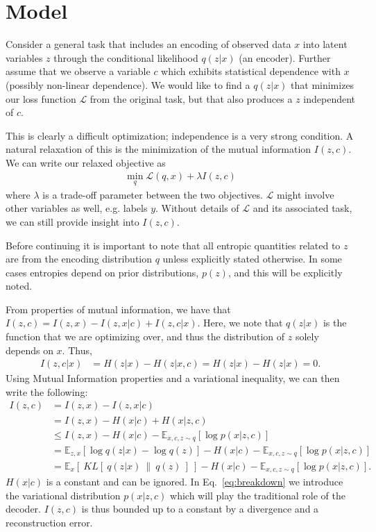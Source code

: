 
\section{Model}
\label{sec:model}

Consider a general task that includes an encoding of observed data $x$ into latent variables $z$ through the conditional likelihood $q(z|x)$ (an encoder). Further assume that we observe a variable $c$ which exhibits statistical dependence with $x$ (possibly non-linear dependence). We would like to find a $q(z|x)$ that minimizes our loss function $\mathcal{L}$ from the original task, but that also produces a $z$ independent of $c$.

This is clearly a difficult optimization; independence is a very strong condition. A natural relaxation of this is the minimization of the mutual information $I(z,c)$. We can write our relaxed objective as
\begin{align}
\min_q \mathcal{L}(q,x) + \lambda I(z,c) \label{eq:gen_loss}
\end{align}
where $\lambda$ is a trade-off parameter between the two objectives. $\mathcal{L}$ might involve other variables as well, e.g. labels $y$. Without details of $\mathcal{L}$ and its associated task, we can still provide insight into $I(z,c)$. 

Before continuing it is important to note that all entropic quantities related to $z$ are from the encoding distribution $q$ unless explicitly stated otherwise. In some cases entropies depend on prior distributions, $p(z)$, and this will be explicitly noted.

From properties of mutual information, we have that $I(z,c) = I(z, x) - I(z, x | c) + I(z, c |x)$. Here, we note that $q(z|x)$ is the function that we are optimizing over, and thus the distribution of $z$ solely depends on $x$. Thus,
\begin{align}
I(z, c |x) & = H(z|x) - H(z|x,c) = H(z|x) - H(z|x) = 0.
\end{align}
Using Mutual Information properties and a variational inequality, we can then write the following:
\begin{align}
I(z,c) & = I(z, x) - I(z, x | c)\label{eq:fork_in_road}\\
& = I(z, x) - H(x|c) + H(x | z, c) \\
& \leq I(z, x) - H(x|c) - \mathbb{E}_{x,c,z \sim q}[ \log p(x|z,c)] \label{eq:breakdown} \\
& = \mathbb{E}_{z,x}[ \log q(z|x) - \log q(z)] - H(x|c) - \mathbb{E}_{x,c,z\sim q}[ \log p(x|z,c)]\\
& = \mathbb{E}_{x}[~KL[~q(z|x)~\|~q(z)~]~  ] - H(x|c) - \mathbb{E}_{x,c,z\sim q}[ \log p(x|z,c)]. \label{eq:penalty}
\end{align}
$H(x|c)$ is a constant and can be ignored. In Eq.~\ref{eq:breakdown} we introduce the variational distribution $p(x|z,c)$ which will play the traditional role of the decoder. 
$I(z,c)$ is thus bounded up to a constant by a divergence and a reconstruction error.

